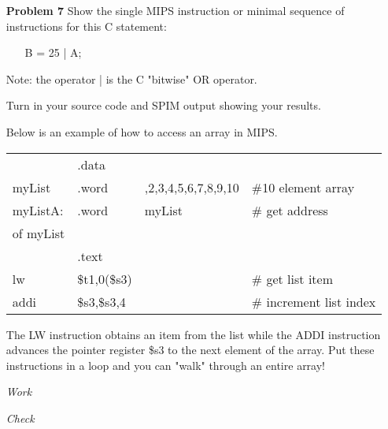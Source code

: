 \documentclass[12pt]{article}
\begin{document}
\begin{enumerate}
  \item[\textbf{Problem 7}] Show the single MIPS instruction or minimal sequence of instructions for this C statement:
  \begin{enumerate}\ttfamily
    \item[] B = 25 | A;
  \end{enumerate}

  \item[] Note: the operator | is the C "bitwise" OR operator.

  \item[] Turn in your source code and SPIM output showing your results.

  \item[] Below is an example of how to access an array in MIPS.

  \begin{tabular}{>{\ttfamily}p{4em}>{\ttfamily}p{5em}>{\ttfamily}p{10em}>{\ttfamily}p{10em}}
              & .data	  & & \\
		myList    & .word	  & 1,2,3,4,5,6,7,8,9,10 & \#10 element array \\
		myListA:  & .word   & myList & \# get address \\
		of myList &       	&        & \\
		          & .text	  &        & \\
		lw        & \$t1,0(\$s3)	& & \# get list item \\
		addi      & \$s3,\$s3,4 	& & \# increment list index \\
  \end{tabular}

  \item[] The LW instruction obtains an item from the list while the ADDI instruction advances the pointer register \$s3 to the next element of the array. Put these instructions in a loop and you can "walk" through an entire array!
\end{enumerate}

\begin{enumerate}
  \item[\textit{Work}]
  \item[\textit{Check}]
\end{enumerate}
\end{document}
